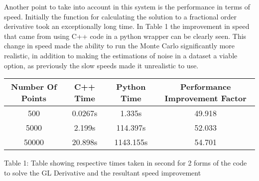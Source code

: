 Another point to take into account in this system is the performance in terms of speed. Initially the function for calculating the solution to a fractional order derivative took an exceptionally long time. In Table 1 the improvement in speed that came from using C++ code in a python wrapper can be clearly seen. This change in speed made the ability to run the Monte Carlo significantly more realistic, in addition to making the estimations of noise in a dataset a viable option, as previously the slow speeds made it unrealistic to use.


\begin{center}
\begin{tabular}{||c c c c||}
 \hline
 Number Of Points & C++ Time & Python Time & Performance Improvement Factor \\ [0.5ex] 
 \hline\hline
500 & 0.0267s & 1.335s & 49.918 \\ [1ex] 
 \hline
5000 & 2.199s & 114.397s & 52.033 \\ [1ex] 
 \hline
50000 & 20.898s & 1143.155s & 54.701 \\ [1ex] 
\hline
\end{tabular}
\end{center}
\caption{Table 1: Table showing respective times taken in second for 2 forms of the code to solve the GL Derivative and the resultant speed improvement}
